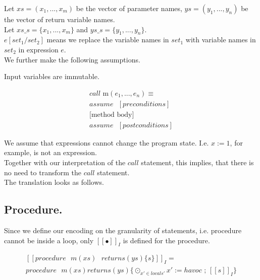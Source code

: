 \documentclass[a4paper,12pt]{article}
\begin{document}
	Let $xs = (x_1,...,x_m)$ be the vector of parameter names, $ys = (y_1,...,y_n)$ be the vector of return variable names.
	\\
	
	Let $xs\_s = \{x_1,...,x_m\}$ and $ys\_s = \{y_1,...,y_n\}$.
	\\
	
	$e[set_1 / set_2]$ means we replace the variable names in $set_1$ with variable names in $set_2$ in expression $e$.
	\\
	
	We further make the following assumptions.
	
	Input variables are immutable.
	
	\begin{equation*}
	\begin{multlined}
		call \text{ m} (e_1,...,e_n) \equiv \\
			assume \text{ } [preconditions] \\
			\text{[method body]} \\
			assume \text{ } [postconditions]
	\end{multlined}
	\end{equation*}
	
	We assume that expressions cannot change the program state. I.e. $x := 1$, for example, is not an expression.
	\\
	
	Together with our interpretation of the $call$ statement, this implies, that there is no need to transform the $call$ statement.
	\\
	
	The translation looks as follows.
	
	\subsection{Procedure.}
	
	Since we define our encoding on the granularity of statements, i.e. procedure cannot be inside a loop, 
	only $[[\bullet]]_I$ is defined for the procedure.
	
	\begin{equation*}
	\begin{multlined}
		[[procedure \text{ } m(xs) \text{ } 
		returns(ys)\{s\}]]_{I}
		= \\
		procedure \text{ } m(xs) 
		returns(ys)
		\{
		\odot_{x' \in locals'} x' := havoc \text{ ; }
		[[s]]_{I}
		\}
	\end{multlined}
	\end{equation*}
	\\
	
\end{document}
